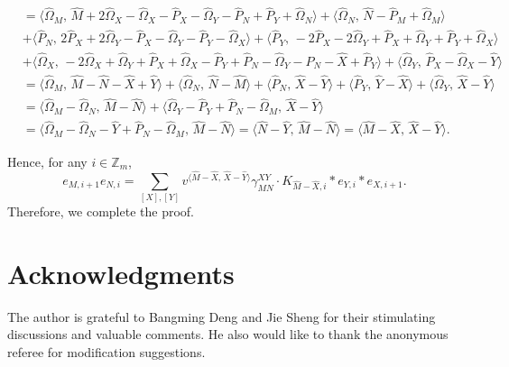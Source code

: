 \documentclass[reqno,12pt]{amsart}
\numberwithin{equation}{section}
\theoremstyle{plain}
\theoremstyle{definition}
\begin{document}
\begin{equation*}\begin{split}
&={\langle {\hat{\Omega}_M,\,\hat{M}+2\hat{\Omega}_X-\hat{\Omega}_X-\hat{P}_X-\hat{\Omega}_Y-\hat{P}_N+\hat{P}_Y+\hat{\Omega}_N}\rangle}
+{\langle {\hat{\Omega}_N,\,\hat{N}-\hat{P}_M+\hat{\Omega}_M}\rangle}\\
&+{\langle {\hat{P}_N,\,2\hat{P}_X+2\hat{\Omega}_Y-\hat{P}_X-\hat{\Omega}_Y-\hat{P}_Y-\hat{\Omega}_X}\rangle}+{\langle {\hat{P}_Y,\,-2\hat{P}_X-2\hat{\Omega}_Y+\hat{P}_X+\hat{\Omega}_Y+\hat{P}_Y+\hat{\Omega}_X}\rangle}
\\&+{\langle {\hat{\Omega}_X,\,-2\hat{\Omega}_X+\hat{\Omega}_Y+\hat{P}_X+\hat{\Omega}_X-\hat{P}_Y+\hat{P}_N-\hat{\Omega}_Y-\hat{P}_N-\hat{X}+\hat{P}_Y}\rangle}+{\langle {\hat{\Omega}_Y,\,\hat{P}_X-\hat{\Omega}_X-\hat{Y}}\rangle}\\
&={\langle {\hat{\Omega}_M,\,\hat{M}-\hat{N}-\hat{X}+\hat{Y}}\rangle}+{\langle {\hat{\Omega}_N,\,\hat{N}-\hat{M}}\rangle}+{\langle {\hat{P}_N,\,\hat{X}-\hat{Y}}\rangle}+{\langle {\hat{P}_Y,\,\hat{Y}-\hat{X}}\rangle}+{\langle {\hat{\Omega}_Y,\,\hat{X}-\hat{Y}}\rangle}\\
&={\langle {\hat{\Omega}_M-\hat{\Omega}_N,\,\hat{M}-\hat{N}}\rangle}+{\langle {\hat{\Omega}_Y-\hat{P}_Y+\hat{P}_N-\hat{\Omega}_M,\,\hat{X}-\hat{Y}}\rangle}\\
&={\langle {\hat{\Omega}_M-\hat{\Omega}_N-\hat{Y}+\hat{P}_N-\hat{\Omega}_M,\,\hat{M}-\hat{N}}\rangle}
={\langle {\hat{N}-\hat{Y},\,\hat{M}-\hat{N}}\rangle}
={\langle {\hat{M}-\hat{X},\,\hat{X}-\hat{Y}}\rangle}.
\end{split}
\end{equation*}

Hence, for any $i\in\mathbb{Z}_m$,
$$e_{M,i+1}e_{N,i}=\sum\limits_{[X],[Y]}v^{{\langle {\hat{M}-\hat{X},\,\hat{X}-\hat{Y}}\rangle}}\gamma_{MN}^{XY}\cdot
K_{\hat{M}-\hat{X},i}\ast e_{Y,i}\ast e_{X,i+1}.$$ Therefore, we complete the proof.

\section*{Acknowledgments}

The author is grateful to Bangming Deng and Jie Sheng for their stimulating discussions and valuable comments. He also would like to thank the anonymous referee for modification suggestions.
\end{document}
